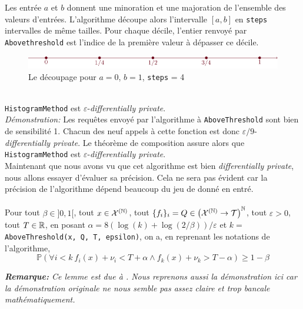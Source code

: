 Les entrée \(a\) et \(b\) donnent une minoration et une majoration de l'ensemble des valeurs d'entrées. L'algorithme découpe alors l'intervalle \([a,b]\) en \texttt{steps} intervalles de même tailles. Pour chaque décile, l'entier renvoyé par \texttt{Abovethreshold} est l'indice de la première valeur à dépasser ce décile.  



\begin{figure}[H]
    \centering
    \includegraphics[]{"./proofs/fig1.pdf"}
    \caption{Le découpage pour \(a = 0\), \(b = 1\), \texttt{steps} = 4}
\end{figure}

\theoreme{}\\
\texttt{HistogramMethod} est \(\varepsilon\)-\textit{differentially private}.\\


\textit{Démonstration:} Les requêtes envoyé par l'algorithme à \texttt{AboveThreshold} sont bien de sensibilité 1. Chacun des neuf appels à cette fonction est donc \(\varepsilon/9\)-\textit{differentially private}. Le théorème de composition assure alors que \texttt{HistogramMethod} est \(\varepsilon\)-\textit{differentially private}.\\

Maintenant que nous avons vu que cet algorithme est bien \textit{differentially private}, nous allons essayer d'évaluer sa précision. Cela ne sera pas évident car la précision de l'algorithme dépend beaucoup du jeu de donné en entré.\\




 \label{ATalphabeta}\\
Pour tout \(\beta \in ]0,1[\), tout \(x \in \mathcal X^{(\mathbb{N})}\), tout \(\{f_i\}_i = Q \in \left( \mathcal X^{(\mathbb{N})} \to  \mathcal T \right)^{\mathbb{N}}\), tout \(\varepsilon > 0\), tout \(T \in \mathbb{R}\),  en posant \(\alpha = 8\left( \log(k) + \log(2/\beta) \right)/\varepsilon\) et \(k = \) \texttt{AboveThreshold(x, Q, T, epsilon)}, on a, en reprenant les notations de l'algorithme,
\[
    \mathbb P \left( \forall i < k \  f_i(x) + \nu_i < T + \alpha \wedge f_k(x) + \nu_k > T - \alpha \right) \geq 1 - \beta
\]

\textit{\textbf{Remarque:} Ce lemme est due à \cite[page 61]{dwork2014the}. Nous reprenons aussi la démonstration ici car la démonstration originale ne nous semble pas assez claire et trop bancale mathématiquement.}\\

